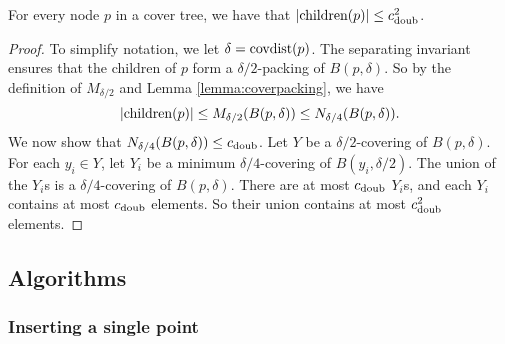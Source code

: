 \documentclass[../main.tex]{subfiles}
\newcommand{\doubnum}{c_\textnormal{doub}}
\newcommand{\p}{\ensuremath p}
\newcommand{\mkfunction}[1]{\ifmmode{\text{{#1}}}}
\newcommand{\children}[1]   {\mkfunction{children}({#1})}
\newcommand{\covdist}[1]    {\mkfunction{covdist}({#1})}
\begin{document}

\begin{lemma}
    \label{lemma:children}
    For every node $p$ in a cover tree, we have that
    $|\children\p| \le \doubnum^2$.
\end{lemma}

\begin{proof}
    To simplify notation, we let $\delta=\covdist{p}$.
    The separating invariant ensures that the children of $p$ form a $\delta/2$-packing of $B(p,\delta)$.
    So by the definition of $M_{\delta/2}$ and Lemma \ref{lemma:coverpacking}, we have
    \begin{equation}
        |\children{p}| 
        \le M_{\delta/2}(B(p,\delta)) 
        \le N_{\delta/4}(B(p,\delta)) 
        .
    \end{equation}
    We now show that $N_{\delta/4}(B(p,\delta))\le\doubnum$.
    Let $Y$ be a $\delta/2$-covering of $B(p,\delta)$.
    For each $y_i\in Y$, let $Y_i$ be a minimum $\delta/4$-covering of $B(y_i,\delta/2)$.
    The union of the $Y_i$s is a $\delta/4$-covering of $B(p,\delta)$.
    There are at most $\doubnum$ $Y_i$s, and each $Y_i$ contains at most $\doubnum$ elements.
    So their union contains at most $\doubnum^2$ elements.
\end{proof}


\subsection{Algorithms}

\subsubsection{Inserting a single point}
\end{document}
